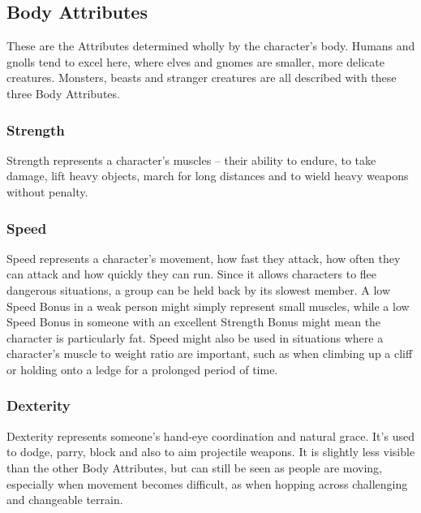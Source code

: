 \documentclass[titlepage,a4paper,openany]{book}
\begin{document}
\begin{multicols}{2}

\subsection{Body Attributes}

These are the Attributes determined wholly by the character's body. Humans and gnolls tend to excel here, where elves and gnomes are smaller, more delicate creatures. Monsters, beasts and stranger creatures are all described with these three Body Attributes.

\subsubsection{Strength}

Strength represents a character's muscles -- their ability to endure, to take damage, lift heavy objects, march for long distances and to wield heavy weapons without penalty.

\subsubsection{Speed}

Speed represents a character's movement, how fast they attack, how often they can attack and how quickly they can run. Since it allows characters to flee dangerous situations, a group can be held back by its slowest member. A low Speed Bonus in a weak person might simply represent small muscles, while a low Speed Bonus in someone with an excellent Strength Bonus might mean the character is particularly fat. Speed might also be used in situations where a character's muscle to weight ratio are important, such as when climbing up a cliff or holding onto a ledge for a prolonged period of time.

\subsubsection{Dexterity}

Dexterity represents someone's hand-eye coordination and natural grace. It's used to dodge, parry, block and also to aim projectile weapons. It is slightly less visible than the other Body Attributes, but can still be seen as people are moving, especially when movement becomes difficult, as when hopping across challenging and changeable terrain.


\end{multicols}
\end{document}
